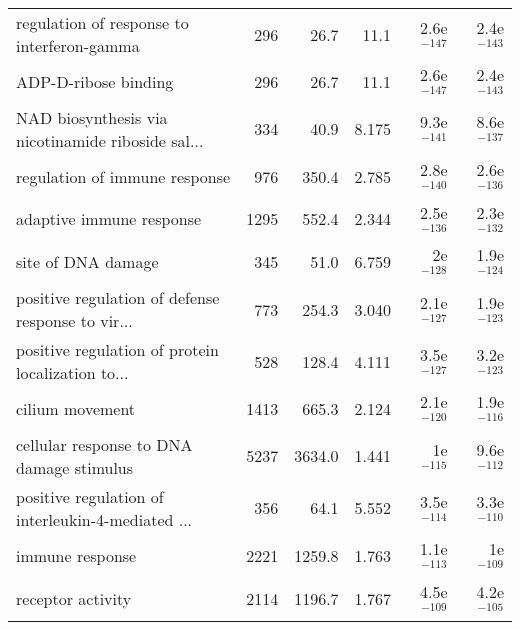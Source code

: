 \begin{longtable}{lrrrrr}
        regulation of response to interferon-gamma &                     296 &                    26.7 &       11.1 &        2.6e$^{-147}$ &        2.4e$^{-143}$ \\
                              ADP-D-ribose binding &                     296 &                    26.7 &       11.1 &        2.6e$^{-147}$ &        2.4e$^{-143}$ \\
 NAD biosynthesis via nicotinamide riboside sal... &                     334 &                    40.9 &      8.175 &        9.3e$^{-141}$ &        8.6e$^{-137}$ \\
                     regulation of immune response &                     976 &                   350.4 &      2.785 &        2.8e$^{-140}$ &        2.6e$^{-136}$ \\
                          adaptive immune response &                    1295 &                   552.4 &      2.344 &        2.5e$^{-136}$ &        2.3e$^{-132}$ \\
                                site of DNA damage &                     345 &                    51.0 &      6.759 &          2e$^{-128}$ &        1.9e$^{-124}$ \\
 positive regulation of defense response to vir... &                     773 &                   254.3 &      3.040 &        2.1e$^{-127}$ &        1.9e$^{-123}$ \\
 positive regulation of protein localization to... &                     528 &                   128.4 &      4.111 &        3.5e$^{-127}$ &        3.2e$^{-123}$ \\
                                   cilium movement &                    1413 &                   665.3 &      2.124 &        2.1e$^{-120}$ &        1.9e$^{-116}$ \\
          cellular response to DNA damage stimulus &                    5237 &                  3634.0 &      1.441 &          1e$^{-115}$ &        9.6e$^{-112}$ \\
 positive regulation of interleukin-4-mediated ... &                     356 &                    64.1 &      5.552 &        3.5e$^{-114}$ &        3.3e$^{-110}$ \\
                                   immune response &                    2221 &                  1259.8 &      1.763 &        1.1e$^{-113}$ &          1e$^{-109}$ \\
                                 receptor activity &                    2114 &                  1196.7 &      1.767 &        4.5e$^{-109}$ &        4.2e$^{-105}$ \\

\end{longtable}
